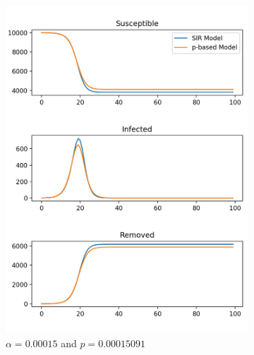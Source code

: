 \documentclass[12pt]{article}
\begin{document}
\begin{figure}[t!]
\begin{subfigure}[t]{0.3\textwidth}
\includegraphics[width=\textwidth]{sir_comparison_15.png}
\caption{$\alpha = 0.00015$ and $p = 0.00015091$}
\end{subfigure}
~
\begin{subfigure}[t]{0.3\textwidth}

\end{subfigure}
\end{figure}
\end{document}
